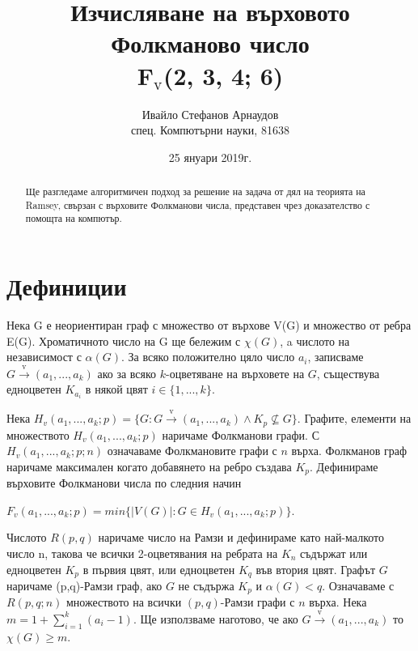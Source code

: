 \documentclass[letterpaper,12pt]{article}
\begin{document}
\title{Изчисляване на върховото Фолкманово число \\ F$_{\text{v}}$(2, 3, 4; 6)}
\author{Ивайло Стефанов Арнаудов \\ \small{спец. Компютърни науки, 81638}}
\date{25 януари 2019г.}
\maketitle

\begin{abstract}
Ще разгледаме алгоритмичен подход за решение на задача от дял на теорията на Ramsey, свързан с върховите Фолкманови числа, представен чрез доказателство с помощта на компютър.
\end{abstract}


\section{Дефиниции}

Нека G е неориентиран граф с множество от върхове V(G) и множество от ребра E(G). Хроматичното число на G ще бележим с  $\chi(G)$, a числото на независимост с $\alpha(G)$. За всяко положително цяло число $a_i$, записваме $G \xrightarrow{\text{v}} (a_1,..., a_k)$ ако за всяко $k$-оцветяване на върховете на $G$, съществува едноцветен $K_{a_i}$ в някой цвят $i \in \{1, ..., k\}$.

Нека $H_v(a_1,..., a_k;p) = \{G : G \xrightarrow{\text{v}} (a_1, ..., a_k) \land K_p \nsubseteq G \}$. Графите, елементи на множеството $H_v(a_1,..., a_k;p)$ наричаме Фолкманови графи. С $H_v(a_1,..., a_k;p;n)$ означаваме Фолкмановите графи с $n$ върха. Фолкманов граф наричаме максимален когато добавянето на ребро създава $K_p$. Дефинираме върховите Фолкманови числа по следния начин

\begin{center}
$F_v(a_1,...,a_k;p) = min \{|V(G)| : G \in H_v(a_1,...,a_k;p)\}$.
\end{center}

Числото $R(p, q)$ наричаме число на Рамзи и дефинираме като най-малкото число n, такова че всички 2-оцветявания на ребрата на $K_n$ съдържат или едноцветен $K_p$ в първия цвят, или едноцветен $K_q$ във втория цвят. Графът $G$ наричаме (p,q)-Рамзи граф, ако $G$ не съдържа $K_p$ и $\alpha(G) < q$. Означаваме с $R(p,q;n)$ множеството на всички $(p,q)$-Рамзи графи с $n$ върха. Нека $m = 1 + \sum_{i=1}^{k} (a_i-1)$. Ще използваме наготово, че ако  $G \xrightarrow{\text{v}} (a_1,..., a_k)$ то $\chi(G) \geq m$.
\end{document}
